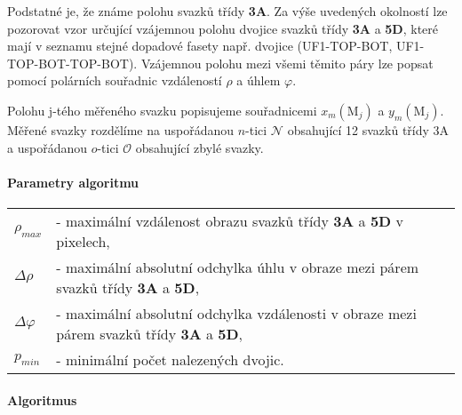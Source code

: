 	Podstatné je, že známe polohu svazků třídy \textbf{3A}. Za výše uvedených okolností lze pozorovat vzor určující vzájemnou polohu dvojice svazků třídy \textbf{3A} a \textbf{5D}, které mají v seznamu stejné dopadové fasety např. dvojice (UF1-TOP-BOT, UF1-TOP-BOT-TOP-BOT). Vzájemnou polohu mezi všemi těmito páry lze popsat pomocí polárních souřadnic vzdáleností $\rho$ a úhlem $\varphi$. 
	
	Polohu j-tého měřeného svazku popisujeme souřadnicemi $x_m(\mathrm{M}_j)$ a $y_m(\mathrm{M}_j)$. Měřené svazky rozdělíme na uspořádanou $n$-tici $\mathcal{N}$ obsahující 12 svazků třídy 3A a uspořádanou $o$-tici $\mathcal{O}$ obsahující zbylé svazky. 

\paragraph{Parametry algoritmu}
\hspace{1mm}

	 \begin{tabular}{l l}
	 $\rho_{max}$ & - maximální vzdálenost obrazu svazků třídy \textbf{3A} a \textbf{5D} v pixelech,\\
	 $\Delta\rho$ & - maximální absolutní odchylka úhlu v obraze mezi párem svazků třídy \textbf{3A} a \textbf{5D},\\
	 $\Delta\varphi$ & - maximální absolutní odchylka vzdálenosti v obraze mezi párem svazků třídy \textbf{3A} a \textbf{5D},\\
	 $p_{min}$ & - minimální počet nalezených dvojic.\\
	 \end{tabular}

\paragraph{Algoritmus}

